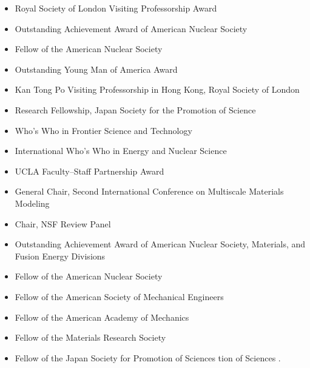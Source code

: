 \documentclass[letterpaper,10pt,english]{jupyterBook}
\begin{document}
\sphinxAtStartPar
{}
\begin{itemize}
\item {} 
\sphinxAtStartPar
Royal Society of London Visiting Professorship Award

\item {} 
\sphinxAtStartPar
Outstanding Achievement Award of American Nuclear Society

\item {} 
\sphinxAtStartPar
Fellow of the American Nuclear Society

\item {} 
\sphinxAtStartPar
Outstanding Young Man of America Award

\item {} 
\sphinxAtStartPar
Kan Tong Po Visiting Professorship in Hong Kong, Royal Society of London

\item {} 
\sphinxAtStartPar
Research Fellowship, Japan Society for the Promotion of Science

\item {} 
\sphinxAtStartPar
Who’s Who in Frontier Science and Technology

\item {} 
\sphinxAtStartPar
International Who’s Who in Energy and Nuclear Science

\item {} 
\sphinxAtStartPar
UCLA Faculty–Staff Partnership Award

\item {} 
\sphinxAtStartPar
General Chair, Second International Conference on Multiscale Materials Modeling

\item {} 
\sphinxAtStartPar
Chair, NSF Review Panel

\item {} 
\sphinxAtStartPar
Outstanding Achievement Award of American Nuclear Society, Materials, and Fusion Energy Divisions

\item {} 
\sphinxAtStartPar
Fellow of the American Nuclear Society

\item {} 
\sphinxAtStartPar
Fellow of the American Society of Mechanical Engineers

\item {} 
\sphinxAtStartPar
Fellow of the American Academy of Mechanics

\item {} 
\sphinxAtStartPar
Fellow of the Materials Research Society

\item {} 
\sphinxAtStartPar
Fellow of the Japan Society for Promotion of Sciences
tion of Sciences
.

\end{itemize}
\end{document}
